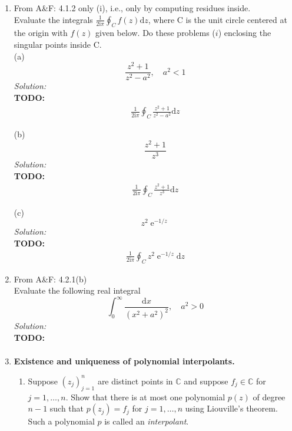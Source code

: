 \documentclass[10pt]{amsart}
\newcommand{\D}{\mathrm{d}}
\newcommand{\I}{\mathrm{i}}
\DeclareMathOperator{\E}{e}
\theoremstyle{nonumberplain}
\begin{document}
\mline
\begin{enumerate}[label={\bf {\arabic*}:}]
\item From A\&F: 4.1.2 only (i), i.e., only by computing residues inside.\\
Evaluate the integrals $\frac 1 {2 \I \pi} \oint_C f(z) \D z$, where C is the unit circle centered at the origin with $f(z)$ given below.
Do these problems ($i$) enclosing the singular points inside C. \\

\noindent
(a)
$$
\frac {z^2 + 1}{ z^2 - a^2 }, \quad a^2 < 1
$$
\textit{Solution:} \\
\textbf{TODO:}
\begin{align*}
\frac 1 {2 \I \pi} \oint_C \frac {z^2 + 1}{ z^2 - a^2 } \D z
\end{align*}

\noindent
(b)
$$
\frac {z^2 + 1}{ z^3 }
$$
\textit{Solution:} \\
\textbf{TODO:}
\begin{align*}
\frac 1 {2 \I \pi} \oint_C \frac {z^2 + 1}{ z^3 } \D z
\end{align*}

\noindent
(c)
$$
z^2\E^{-1/z}
$$
\textit{Solution:} \\
\textbf{TODO:}
\begin{align*}
\frac 1 {2 \I \pi} \oint_C z^2\E^{-1/z} \D z
\end{align*}

\newpage


\item From A\&F: 4.2.1(b)\\
Evaluate the following real integral
$$
\int_0^\infty \frac {\D x}{ (x^2 + a^2)^2 }, \quad a^2 > 0
$$
\textit{Solution:} \\
\textbf{TODO:}
\begin{align*}
\end{align*}

\newpage


\item  \textbf{Existence and uniqueness of polynomial interpolants.}
\begin{enumerate}
\item Suppose $(z_j)_{j = 1}^n$ are distinct points in $\mathbb C$ and suppose $f_j \in \mathbb C$ for $j = 1,\ldots,n$.
Show that there is at most one polynomial $p(z)$ of degree $n-1$ such that $p(z_j) = f_j$ for $j = 1,\ldots,n$ using Liouville's theorem.
Such a polynomial $p$ is called an \emph{interpolant}. \\


\end{enumerate}
\end{enumerate}
\end{document}
